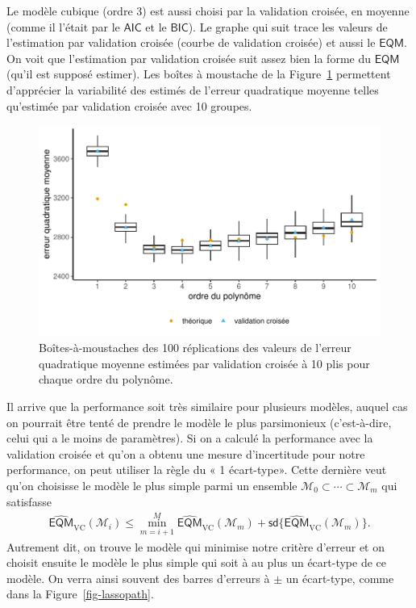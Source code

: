 \documentclass[
  11pt,
  letterpaper,
]{scrbook}
\theoremstyle{definition}
\theoremstyle{remark}
\begin{document}
Le modèle cubique (ordre 3) est aussi choisi par la validation croisée,
en moyenne (comme il l'était par le \(\mathsf{AIC}\) et le
\(\mathsf{BIC}\)). Le graphe qui suit trace les valeurs de l'estimation
par validation croisée (courbe de validation croisée) et aussi le
\(\mathsf{EQM}\). On voit que l'estimation par validation croisée suit
assez bien la forme du \(\mathsf{EQM}\) (qu'il est supposé estimer). Les
boîtes à moustache de la Figure~\ref{fig-plotcv} permettent d'apprécier
la variabilité des estimés de l'erreur quadratique moyenne telles
qu'estimée par validation croisée avec 10 groupes.

\begin{figure}[ht!]

{\centering \includegraphics[width=1\textwidth,height=\textheight]{selectionmodeles_files/figure-pdf/fig-plotcv-1.pdf}

}

\caption{\label{fig-plotcv}Boîtes-à-moustaches des 100 réplications des
valeurs de l'erreur quadratique moyenne estimées par validation croisée
à 10 plis pour chaque ordre du polynôme.}

\end{figure}

Il arrive que la performance soit très similaire pour plusieurs modèles,
auquel cas on pourrait être tenté de prendre le modèle le plus
parsimonieux (c'est-à-dire, celui qui a le moins de paramètres). Si on a
calculé la performance avec la validation croisée et qu'on a obtenu une
mesure d'incertitude pour notre performance, on peut utiliser la règle
du « 1 écart-type». Cette dernière veut qu'on choisisse le modèle le
plus simple parmi un ensemble
\(\mathcal{M}_0 \subset\cdots \subset \mathcal{M}_m\) qui satisfasse
\begin{align*}
\widehat{\mathsf{EQM}}_{\text{VC}}(\mathcal{M}_i) \leq \min_{m = i+1}^M \widehat{\mathsf{EQM}}_{\text{VC}}(\mathcal{M}_m) + \mathsf{sd}\{\widehat{\mathsf{EQM}}_{\text{VC}}(\mathcal{M}_m)\}.
\end{align*} Autrement dit, on trouve le modèle qui minimise notre
critère d'erreur et on choisit ensuite le modèle le plus simple qui soit
à au plus un écart-type de ce modèle. On verra ainsi souvent des barres
d'erreurs à \(\pm\) un écart-type, comme dans la
Figure~\ref{fig-lassopath}.
\end{document}
